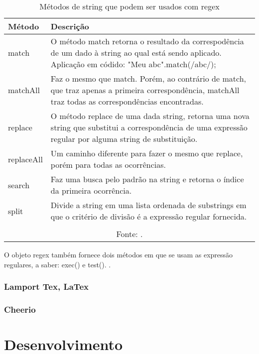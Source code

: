\begin{table}[H]
    \centering
    \caption{Métodos de string que podem ser usados com regex}
    \label{tbl:string-methods-regex}
    \renewcommand{\arraystretch}{1.5}
    \begin{tabular}{p{2.4000cm} p{13.6000cm}}
        \hline
        \textbf{Método} & \textbf{Descrição} \\
        \hline
        match & O método match retorna o resultado da correspodência de um dado
            \cite{mdn-regex}
            à string ao qual está sendo aplicado. Aplicação em códido:
            "Meu abc".match(/abc/);
         \\
		matchAll & Faz o mesmo que match. Porém, ao contrário de match, que traz apenas
            a primeira correspondência, matchAll traz todas as correspondências
            encontradas.
         \\
		replace & O método replace de uma dada string, retorna uma nova string que substitui
            a correspondência de uma expressão regular por alguma string de substituição.
         \\
		replaceAll & Um caminho diferente para fazer o mesmo que replace, porém para todas
            as ocorrências.
         \\
		search & Faz uma busca pelo padrão na string e retorna o índice da primeira ocorrência. \\
		split & Divide a string em uma lista ordenada de substrings em que o critério de divisão é a expressão regular fornecida. \\
        \hline
        \\\multicolumn{2}{c}{\fontsize{10pt}{12pt}Fonte: \cite{mdn-regex}.}
    \end{tabular}
\end{table}

O objeto
\acrshort{regex}
também fornece dois métodos em que se usam as expressão regulares,
a saber: exec() e test().
\cite{mdn-regex}.

\subsection{Lamport Tex, LaTex}

\subsection{Cheerio}

\chapter{Desenvolvimento}

